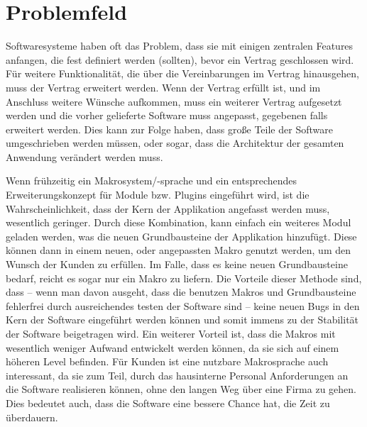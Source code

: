 \section{Problemfeld}
\label{sec:problemfeld}


  Softwaresysteme haben oft das Problem, dass sie mit einigen zentralen Features anfangen, die fest definiert werden (sollten), bevor ein Vertrag geschlossen wird. Für weitere Funktionalität, die über die Vereinbarungen im Vertrag hinausgehen, muss der Vertrag erweitert werden. Wenn der Vertrag erfüllt ist, und im Anschluss weitere Wünsche aufkommen, muss ein weiterer Vertrag aufgesetzt werden und die vorher gelieferte Software muss angepasst, gegebenen falls erweitert werden. Dies kann zur Folge haben, dass große Teile der Software umgeschrieben werden müssen, oder sogar, dass die Architektur der gesamten Anwendung verändert werden muss.

  Wenn frühzeitig ein Makrosystem/-sprache und ein entsprechendes Erweiterungskonzept für Module bzw. Plugins eingeführt wird, ist die Wahrscheinlichkeit, dass der Kern der Applikation angefasst werden muss, wesentlich geringer. Durch diese Kombination, kann einfach ein weiteres Modul geladen werden, was die neuen Grundbausteine der Applikation hinzufügt. Diese können dann in einem neuen, oder angepassten Makro genutzt werden, um den Wunsch der Kunden zu erfüllen. Im Falle, dass es keine neuen Grundbausteine bedarf, reicht es sogar nur ein Makro zu liefern. Die Vorteile dieser Methode sind, dass -- wenn man davon ausgeht, dass die benutzen Makros und Grundbausteine fehlerfrei durch ausreichendes testen der Software sind -- keine neuen Bugs in den Kern der Software eingeführt werden können und somit immens zu der Stabilität der Software beigetragen wird. Ein weiterer Vorteil ist, dass die Makros mit wesentlich weniger Aufwand entwickelt werden können, da sie sich auf einem höheren Level befinden. Für Kunden ist eine nutzbare Makrosprache auch interessant, da sie zum Teil, durch das hausinterne Personal Anforderungen an die Software realisieren können, ohne den langen Weg über eine Firma zu gehen. Dies bedeutet auch, dass die Software eine bessere Chance hat, die Zeit zu überdauern.

